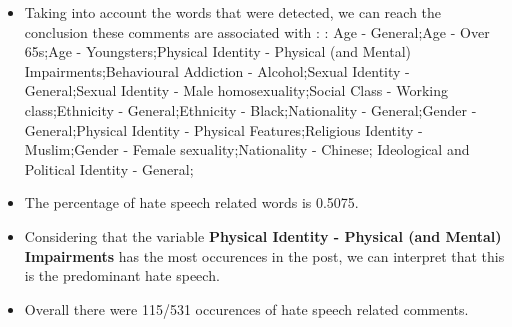 \documentclass[11pt]{article}
\begin{document}
\begin{itemize}\item Taking into account the words that were detected, we can reach the conclusion these comments are associated with : : Age - General;Age - Over 65s;Age - Youngsters;Physical Identity - Physical (and Mental) Impairments;Behavioural Addiction - Alcohol;Sexual Identity - General;Sexual Identity - Male homosexuality;Social Class - Working class;Ethnicity - General;Ethnicity - Black;Nationality - General;Gender - General;Physical Identity - Physical Features;Religious Identity - Muslim;Gender - Female sexuality;Nationality - Chinese; Ideological and Political Identity - General;%

\item The percentage of hate speech related words is 0.5075.

\item Considering that the variable \textbf{Physical Identity - Physical (and Mental) Impairments} has the most occurences in the post, we can interpret that this is the predominant hate speech.

\item Overall there were 115/531 occurences of hate speech related comments.\end{itemize}
\end{document}
